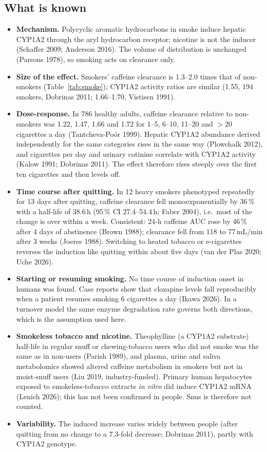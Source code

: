 \documentclass[10pt,a4paper]{article}
\begin{document}
\subsection{What is known}
\begin{itemize}
\item \textbf{Mechanism.} Polycyclic aromatic hydrocarbons in smoke induce hepatic CYP1A2 through the aryl
hydrocarbon receptor; nicotine is not the inducer (Schaffer 2009; Anderson 2016). The volume of distribution is
unchanged (Parsons 1978), so smoking acts on clearance only.
\item \textbf{Size of the effect.} Smokers' caffeine clearance is 1.3--2.0 times that of non-smokers
(Table~\ref{tab:smoke}); CYP1A2 activity ratios are similar (1.55, 194 smokers, Dobrinas 2011; 1.66--1.70,
Vistisen 1991).
\item \textbf{Dose-response.} In 786 healthy adults, caffeine clearance relative to non-smokers was 1.22, 1.47,
1.66 and 1.72 for 1--5, 6--10, 11--20 and $>$20 cigarettes a day (Tantcheva-Po\'or 1999). Hepatic CYP1A2 abundance
derived independently for the same categories rises in the same way (Plowchalk 2012), and cigarettes per day and
urinary cotinine correlate with CYP1A2 activity (Kalow 1991; Dobrinas 2011). The effect therefore rises steeply over
the first ten cigarettes and then levels off.
\item \textbf{Time course after quitting.} In 12 heavy smokers phenotyped repeatedly for 13 days after quitting,
caffeine clearance fell monoexponentially by 36\,\% with a half-life of 38.6\,h (95\,\% CI 27.4--54.4\,h; Faber 2004),
i.e.\ most of the change is over within a week. Consistent: 24-h caffeine AUC rose by 46\,\% after 4 days of
abstinence (Brown 1988); clearance fell from 118 to 77\,mL/min after 3 weeks (Joeres 1988). Switching to heated
tobacco or e-cigarettes reverses the induction like quitting within about five days (van der Plas 2020; Uche 2026).
\item \textbf{Starting or resuming smoking.} No time course of induction onset in humans was found. Case reports
show that clozapine levels fall reproducibly when a patient resumes smoking 6 cigarettes a day (Ikawa 2026). In a
turnover model the same enzyme degradation rate governs both directions, which is the assumption used here.
\item \textbf{Smokeless tobacco and nicotine.} Theophylline (a CYP1A2 substrate) half-life in regular snuff or
chewing-tobacco users who did not smoke was the same as in non-users (Parish 1989), and plasma, urine and saliva
metabolomics showed altered caffeine metabolism in smokers but not in moist-snuff users (Liu 2019, industry-funded).
Primary human hepatocytes exposed to smokeless-tobacco extracts \emph{in vitro} did induce CYP1A2 mRNA (Lenich 2026);
this has not been confirmed in people. Snus is therefore not counted.
\item \textbf{Variability.} The induced increase varies widely between people (after quitting from no change to a
7.3-fold decrease; Dobrinas 2011), partly with CYP1A2 genotype.
\end{itemize}
\end{document}
